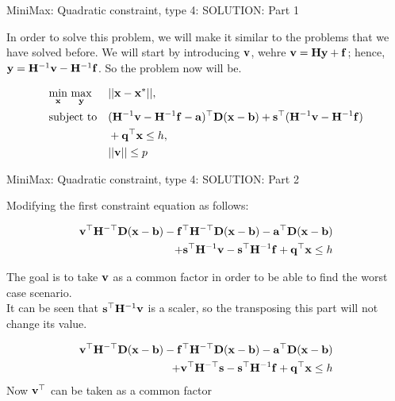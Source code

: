 \documentclass{beamer}
\begin{document}

\begin{frame}{MiniMax: Quadratic constraint, type 4: SOLUTION: Part 1}
\begin{flushleft}

In order to solve this problem, we will make it similar to the problems that we have solved before. We will start by introducing $\mathbf{v}$, wehre $ \mathbf{v} = \mathbf{H}\mathbf{y} + \mathbf{f}$; hence, $ \mathbf{y} = \mathbf{H}^{-1}\mathbf{v} -\mathbf{H}^{-1}\mathbf{f}$. So the problem now will be.

%
\begin{equation}
\begin{aligned}
& \underset{\mathbf{x}}{\text{min}} \ \underset{\mathbf{y}}{\text{max}}
& & ||\mathbf{x} - \mathbf{x}^*||, \\
& \text{subject to}
& & (\mathbf{H}^{-1}\mathbf{v} -\mathbf{H}^{-1}\mathbf{f} - \mathbf{a})^\top \mathbf{D} (\mathbf{x} - \mathbf{b})  +
\mathbf{s}^\top (\mathbf{H}^{-1}\mathbf{v} -\mathbf{H}^{-1}\mathbf{f}) \\ & & & + \mathbf{q}^\top \mathbf{x} \leq h, \\
& & & ||\mathbf{v}|| \leq p
\end{aligned}
\end{equation}
 
\end{flushleft}
\end{frame}


\begin{frame}{MiniMax: Quadratic constraint, type 4: SOLUTION: Part 2}
\begin{flushleft}

Modifying the first constraint equation as follows:

%
\begin{equation}
\begin{aligned}
\mathbf{v}^\top\mathbf{H}^{-\top}\mathbf{D} (\mathbf{x} - \mathbf{b}) -\mathbf{f}^\top\mathbf{H}^{-\top}\mathbf{D} (\mathbf{x} - \mathbf{b}) - \mathbf{a}^\top\mathbf{D} (\mathbf{x} - \mathbf{b}) \\ +
\mathbf{s}^\top\mathbf{H}^{-1}\mathbf{v} -\mathbf{s}^\top\mathbf{H}^{-1}\mathbf{f}  + \mathbf{q}^\top \mathbf{x} \leq h
\end{aligned}
\end{equation}
 
 The goal is to take $\mathbf{v}$ as a common factor in order to be able to find the worst case scenario.\\
 It can be seen that $\mathbf{s}^\top\mathbf{H}^{-1}\mathbf{v}$ is a scaler, so the transposing this part will not change its value.
 
 \begin{equation}
\begin{aligned}
\mathbf{v}^\top\mathbf{H}^{-\top}\mathbf{D} (\mathbf{x} - \mathbf{b}) -\mathbf{f}^\top\mathbf{H}^{-\top}\mathbf{D} (\mathbf{x} - \mathbf{b}) - \mathbf{a}^\top\mathbf{D} (\mathbf{x} - \mathbf{b}) \\ +
\mathbf{v}^\top\mathbf{H}^{-\top}\mathbf{s} -\mathbf{s}^\top\mathbf{H}^{-1}\mathbf{f}  + \mathbf{q}^\top \mathbf{x} \leq h
\end{aligned}
\end{equation}
 Now $\mathbf{v}^\top$ can be taken as a common factor
\end{flushleft}
\end{frame}
\end{document}
